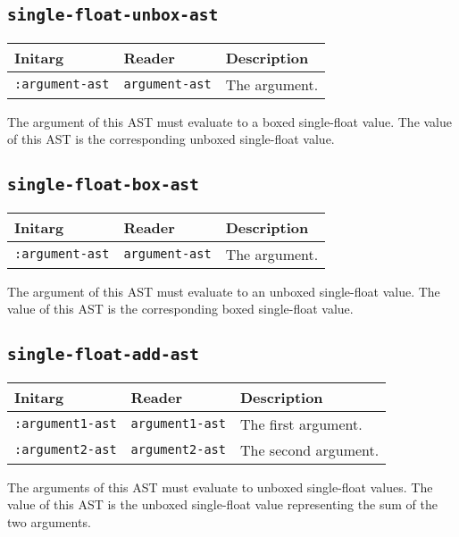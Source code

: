 \subsection{\texttt{single-float-unbox-ast}}
\label{sec-ast-single-float-unbox}

\begin{tabular}{|l|l|l|}
\hline
Initarg & Reader & Description\\
\hline\hline
\texttt{:argument-ast} & \texttt{argument-ast} & The argument.\\
\hline
\end{tabular}

The argument of this AST must evaluate to a boxed single-float value.
The value of this AST is the corresponding unboxed single-float value.

\subsection{\texttt{single-float-box-ast}}
\label{sec-ast-single-float-box}

\begin{tabular}{|l|l|l|}
\hline
Initarg & Reader & Description\\
\hline\hline
\texttt{:argument-ast} & \texttt{argument-ast} & The argument.\\
\hline
\end{tabular}

The argument of this AST must evaluate to an unboxed single-float
value.  The value of this AST is the corresponding boxed single-float
value.

\subsection{\texttt{single-float-add-ast}}
\label{sec-ast-single-float-add}

\begin{tabular}{|l|l|l|}
\hline
Initarg & Reader & Description\\
\hline\hline
\texttt{:argument1-ast} & \texttt{argument1-ast} & The first argument.\\
\hline
\texttt{:argument2-ast} & \texttt{argument2-ast} & The second argument.\\
\hline
\end{tabular}

The arguments of this AST must evaluate to unboxed single-float
values.  The value of this AST is the unboxed single-float value
representing the sum of the two arguments.


